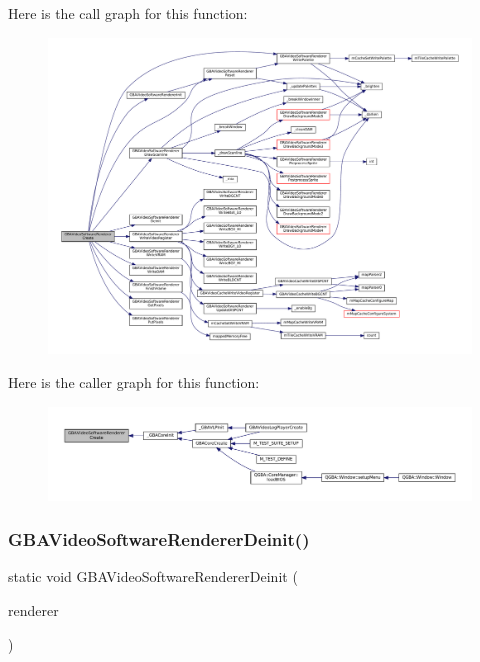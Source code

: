 Here is the call graph for this function\+:
\nopagebreak
\begin{figure}[H]
\begin{center}
\leavevmode
\includegraphics[width=350pt]{video-software_8c_ac2fa4723211d9affabf42dafa0dc56c1_cgraph}
\end{center}
\end{figure}
Here is the caller graph for this function\+:
\nopagebreak
\begin{figure}[H]
\begin{center}
\leavevmode
\includegraphics[width=350pt]{video-software_8c_ac2fa4723211d9affabf42dafa0dc56c1_icgraph}
\end{center}
\end{figure}
\mbox{\label{video-software_8c_ac2c59bbe64e1453e725a61a739187a6b}} 
\subsubsection{\texorpdfstring{G\+B\+A\+Video\+Software\+Renderer\+Deinit()}{GBAVideoSoftwareRendererDeinit()}}
{\footnotesize\ttfamily static void G\+B\+A\+Video\+Software\+Renderer\+Deinit (\begin{DoxyParamCaption}\item[{struct G\+B\+A\+Video\+Renderer $\ast$}]{renderer }\end{DoxyParamCaption})\hspace{0.3cm}{\ttfamily [static]}}

